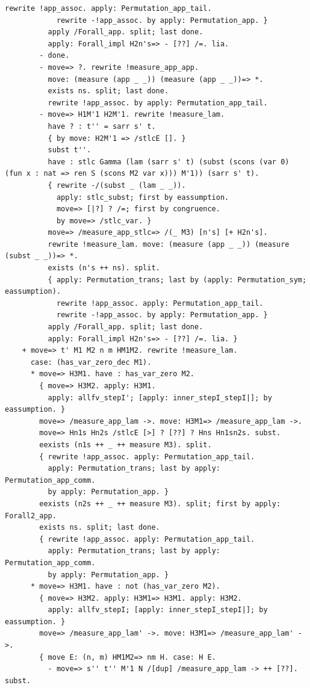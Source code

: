 \documentclass[10pt,a4paper]{article}
\begin{document}
\begin{lstlisting}[style=authorcoq]
            rewrite !app_assoc. apply: Permutation_app_tail.
            rewrite -!app_assoc. by apply: Permutation_app. }
          apply /Forall_app. split; last done.
          apply: Forall_impl H2n's=> - [??] /=. lia.
        - done.
        - move=> ?. rewrite !measure_app_app.
          move: (measure (app _ _)) (measure (app _ _))=> *.
          exists ns. split; last done.
          rewrite !app_assoc. by apply: Permutation_app_tail.
        - move=> H1M'1 H2M'1. rewrite !measure_lam.
          have ? : t'' = sarr s' t.
          { by move: H2M'1 => /stlcE []. }
          subst t''.
          have : stlc Gamma (lam (sarr s' t) (subst (scons (var 0) (fun x : nat => ren S (scons M2 var x))) M'1)) (sarr s' t).
          { rewrite -/(subst _ (lam _ _)).
            apply: stlc_subst; first by eassumption.
            move=> [|?] ? /=; first by congruence.
            by move=> /stlc_var. }
          move=> /measure_app_stlc=> /(_ M3) [n's] [+ H2n's].
          rewrite !measure_lam. move: (measure (app _ _)) (measure (subst _ _))=> *.
          exists (n's ++ ns). split.
          { apply: Permutation_trans; last by (apply: Permutation_sym; eassumption).
            rewrite !app_assoc. apply: Permutation_app_tail.
            rewrite -!app_assoc. by apply: Permutation_app. }
          apply /Forall_app. split; last done.
          apply: Forall_impl H2n's=> - [??] /=. lia. }
    + move=> t' M1 M2 n m HM1M2. rewrite !measure_lam.
      case: (has_var_zero_dec M1).
      * move=> H3M1. have : has_var_zero M2.
        { move=> H3M2. apply: H3M1.
          apply: allfv_stepI'; [apply: inner_stepI_stepI|]; by eassumption. }
        move=> /measure_app_lam ->. move: H3M1=> /measure_app_lam ->.
        move=> Hn1s Hn2s /stlcE [>] ? [??] ? Hns Hn1sn2s. subst.
        eexists (n1s ++ _ ++ measure M3). split.
        { rewrite !app_assoc. apply: Permutation_app_tail.
          apply: Permutation_trans; last by apply: Permutation_app_comm.
          by apply: Permutation_app. }
        eexists (n2s ++ _ ++ measure M3). split; first by apply: Forall2_app.
        exists ns. split; last done.
        { rewrite !app_assoc. apply: Permutation_app_tail.
          apply: Permutation_trans; last by apply: Permutation_app_comm.
          by apply: Permutation_app. }
      * move=> H3M1. have : not (has_var_zero M2).
        { move=> H3M2. apply: H3M1=> H3M1. apply: H3M2.
          apply: allfv_stepI; [apply: inner_stepI_stepI|]; by eassumption. }
        move=> /measure_app_lam' ->. move: H3M1=> /measure_app_lam' ->.
        { move E: (n, m) HM1M2=> nm H. case: H E.
          - move=> s'' t'' M'1 N /[dup] /measure_app_lam -> ++ [??]. subst.

\end{lstlisting}
\end{document}

